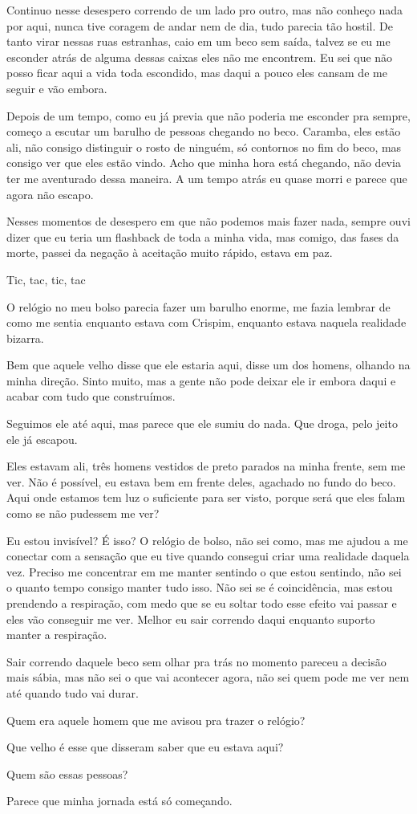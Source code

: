 Continuo nesse desespero correndo de um lado pro outro, mas não conheço nada por aqui, nunca tive coragem de andar nem de dia, tudo parecia tão hostil. De tanto virar nessas ruas estranhas, caio em um beco sem saída, talvez se eu me esconder atrás de alguma dessas caixas eles não me encontrem. Eu sei que não posso ficar aqui a vida toda escondido, mas daqui a pouco eles cansam de me seguir e vão embora.

Depois de um tempo, como eu já previa que não poderia me esconder pra sempre, começo a escutar um barulho de pessoas chegando no beco. Caramba, eles estão ali, não consigo distinguir o rosto de ninguém, só contornos no fim do beco, mas consigo ver que eles estão vindo. Acho que minha hora está chegando, não devia ter me aventurado dessa maneira. A um tempo atrás eu quase morri e parece que agora não escapo.

Nesses momentos de desespero em que não podemos mais fazer nada, sempre ouvi dizer que eu teria um flashback de toda a minha vida, mas comigo, das fases da morte, passei da negação à aceitação muito rápido, estava em paz.

Tic, tac, tic, tac

O relógio no meu bolso parecia fazer um barulho enorme, me fazia lembrar de como me sentia enquanto estava com Crispim, enquanto estava naquela realidade bizarra.

Bem que aquele velho disse que ele estaria aqui, disse um dos homens, olhando na minha direção. Sinto muito, mas a gente não pode deixar ele ir embora daqui e acabar com tudo que construímos.

Seguimos ele até aqui, mas parece que ele sumiu do nada. Que droga, pelo jeito ele já escapou.

Eles estavam ali, três homens vestidos de preto parados na minha frente, sem me ver. Não é possível, eu estava bem em frente deles, agachado no fundo do beco. Aqui onde estamos tem luz o suficiente para ser visto, porque será que eles falam como se não pudessem me ver?

Eu estou invisível? É isso? O relógio de bolso, não sei como, mas me ajudou a me conectar com a sensação que eu tive quando consegui criar uma realidade daquela vez. Preciso me concentrar em me manter sentindo o que estou sentindo, não sei o quanto tempo consigo manter tudo isso. Não sei se é coincidência, mas estou prendendo a respiração, com medo que se eu soltar todo esse efeito vai passar e eles vão conseguir me ver. Melhor eu sair correndo daqui enquanto suporto manter a respiração.

Sair correndo daquele beco sem olhar pra trás no momento pareceu a decisão mais sábia, mas não sei o que vai acontecer agora, não sei quem pode me ver nem até quando tudo vai durar.

Quem era aquele homem que me avisou pra trazer o relógio?

Que velho é esse que disseram saber que eu estava aqui?

Quem são essas pessoas?

Parece que minha jornada está só começando.


